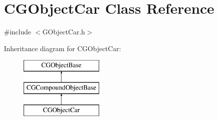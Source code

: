\hypertarget{class_c_g_object_car}{}\section{C\+G\+Object\+Car Class Reference}
\label{class_c_g_object_car}


{\ttfamily \#include $<$G\+Object\+Car.\+h$>$}

Inheritance diagram for C\+G\+Object\+Car\+:\begin{figure}[H]
\begin{center}
\leavevmode
\includegraphics[height=3.000000cm]{class_c_g_object_car}
\end{center}
\end{figure}
